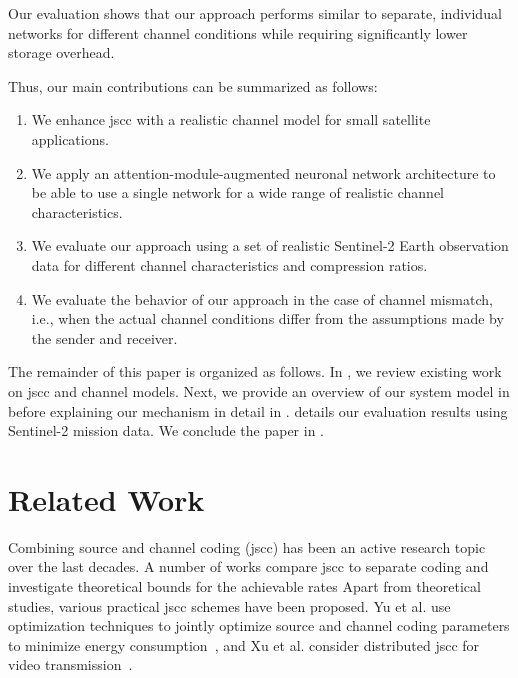 \documentclass[conference]{IEEEtran}
\newcommand\sentinelii{Sentinel-2\xspace}
\begin{document}
Our evaluation shows that our approach performs similar to separate, individual networks for different channel conditions while requiring significantly lower storage overhead.

Thus, our main contributions can be summarized as follows:
%
\begin{enumerate}
  \item We enhance \ac{jscc} with a realistic channel model for small satellite applications.
  \item We apply an attention-module-augmented neuronal network architecture to be able to use a single network for a wide range of realistic channel characteristics.
  \item We evaluate our approach using a set of realistic \sentinelii Earth observation data for different channel characteristics and compression ratios.
  \item We evaluate the behavior of our approach in the case of channel mismatch, i.e., when the actual channel conditions differ from the assumptions made by the sender and receiver.
\end{enumerate}

The remainder of this paper is organized as follows.
In , we review existing work on \ac{jscc} and channel models.
Next, we provide an overview of our system model in  before explaining our mechanism in detail in .
 details our evaluation results using \sentinelii mission data.
We conclude the paper in .

\section{Related Work}
\label{sec:related_work}

Combining source and channel coding (\acs{jscc}) has been an active research topic over the last decades.
A number of works compare \ac{jscc} to separate coding and investigate theoretical bounds for the achievable rates \cite{gallager1968information,1614076,4557472}
Apart from theoretical studies, various practical \ac{jscc} schemes have been proposed.
Yu et al. use optimization techniques to jointly optimize source and channel coding parameters to minimize energy consumption~\cite{Wei2004}, and
Xu et al. consider distributed \ac{jscc} for video transmission~\cite{4205066}. 
\end{document}
